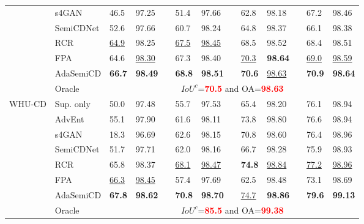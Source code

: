 \documentclass[lang=chs, degree=master, blindreview=false, adobe=false]{yanputhesis}
\begin{document}
\begin{table}[!htbp]
{\begin{tabular}{p{20mm}p{20mm}p{8mm}p{8mm}cp{8mm}p{8mm}cp{8mm}p{8mm}cp{8mm}p{8mm}}
      & s4GAN\cite{mittal2019semi}& 46.5 & 97.25 && 51.4 & 97.66 && 62.8 & 98.18 && 67.2 & 98.46 \\
      & SemiCDNet\cite{peng2021SemiCDNet} & 52.6 & 97.66 && 60.7 & 98.24 && 64.8 & 98.37 && 66.1 & 98.38 \\ %
      & RCR\cite{bandara2022RCR}& \underline{64.9} & 98.25 && \underline{67.5} & \underline{98.45} && 68.5 & 98.52 && 68.4 & 98.51 \\
      & FPA\cite{Zhang2023FPA}& 64.6 & \underline{98.30} && 67.3 & 98.40 && \underline{70.3} & \cellcolor{mycyan}\textbf{98.64} && \underline{69.0} & \underline{98.59} \\
      \rowcolor{mycyan}
      \multirow{-8}{*}{\cellcolor{white}}& \cellcolor{white}AdaSemiCD   &   \textbf{66.7} & \textbf{98.49} && \textbf{68.8} & \textbf{98.51} && \textbf{70.6} & \cellcolor{white}\underline{98.63} && \textbf{70.9} & \textbf{98.64} \\%
      \cline{2-13}
      & Oracle & \multicolumn{11}{c}{$ IoU^c$=\textcolor{red}{\bf 70.5} and OA=\textcolor{red}{\bf 98.63}} \\
      \bottomrule
      \multirow{8}{*}{WHU-CD}
      & Sup. only   &   50.0 & 97.48 && 55.7 & 97.53 && 65.4 & 98.20 && 76.1 & 98.94 \\ %
      & AdvEnt\cite{vu2019advent}& 55.1 & 97.90 && 61.6 & 98.11 && 73.8 & 98.80 && 76.6 & 98.94 \\ %
      & s4GAN\cite{mittal2019semi}& 18.3 & 96.69 && 62.6 & 98.15 && 70.8 & 98.60 && 76.4 & 98.96 \\
      & SemiCDNet\cite{peng2021SemiCDNet} & 51.7 & 97.71 && 62.0 & 98.16 && 66.7 & 98.28 && 75.9 & 98.93 \\ %
      & RCR\cite{bandara2022RCR}& 65.8 & 98.37 && \underline{68.1} & \underline{98.47} && \cellcolor{mycyan}\textbf{74.8} & \underline{98.84} && \underline{77.2} & \underline{98.96} \\
      & FPA\cite{Zhang2023FPA}& \underline{66.3} & \underline{98.45} && 57.4 & 97.69 && 62.5 & 98.48 && 73.1 & 98.69 \\
      \rowcolor{mycyan}
      \multirow{-8}{*}{\cellcolor{white}}& \cellcolor{white}AdaSemiCD   &   \textbf{67.8} & \textbf{98.62} && \textbf{70.8} & \textbf{98.70} && \cellcolor{white}\underline{74.7} & \textbf{98.86} && \textbf{79.6} & \textbf{99.13} \\%
      \cline{2-13}
      & Oracle & \multicolumn{11}{c}{$ IoU^c$=\textcolor{red}{\bf 85.5} and OA=\textcolor{red}{\bf 99.38}} \\

\end{tabular}}
\end{table}
\end{document}
